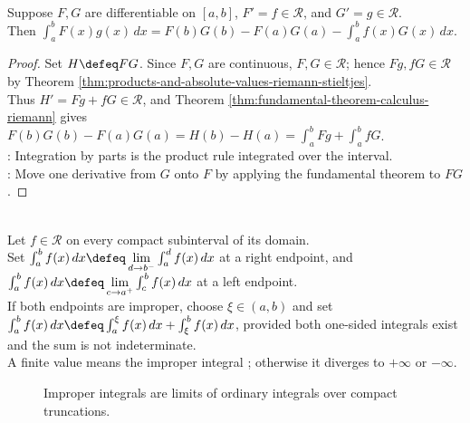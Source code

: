 \begin{theorem} \label{thm:riemann-integration-by-parts} \\
Suppose $F,G$ are differentiable on $[a,b]$, $F'=f\in\mathcal{R}$, and $G'=g\in\mathcal{R}$.\\
Then $\int_a^b F(x)g(x)\,dx=F(b)G(b)-F(a)G(a)-\int_a^b f(x)G(x)\,dx$.
\begin{proof}
Set $H\defeq FG$. Since $F,G$ are continuous, $F,G\in\mathcal{R}$; hence $Fg,fG\in\mathcal{R}$ by Theorem \ref{thm:products-and-absolute-values-riemann-stieltjes}.\\
Thus $H'=Fg+fG\in\mathcal{R}$, and Theorem \ref{thm:fundamental-theorem-calculus-riemann} gives $F(b)G(b)-F(a)G(a)=H(b)-H(a)=\int_a^b Fg+\int_a^b fG$.\\
: Integration by parts is the product rule integrated over the interval.\\
: Move one derivative from $G$ onto $F$ by applying the fundamental theorem to $FG$.
\end{proof}
\end{theorem}

\begin{definition} \label{def:improper-riemann-integral} \\
Let $f\in\mathcal{R}$ on every compact subinterval of its domain.\\
Set $\int_a^b f(x)\,dx\defeq\lim\limits_{d\to b^-}\int_a^d f(x)\,dx$ at a right endpoint, and $\int_a^b f(x)\,dx\defeq\lim\limits_{c\to a^+}\int_c^b f(x)\,dx$ at a left endpoint.\\
If both endpoints are improper, choose $\xi\in(a,b)$ and set $\int_a^b f(x)\,dx \defeq \int_a^\xi f(x)\,dx+\int_\xi^b f(x)\,dx$, provided both one-sided integrals exist and the sum is not indeterminate.\\
A finite value means the improper integral ; otherwise it diverges to $+\infty$ or $-\infty$.
\end{definition}

\begin{figure}[H]
  \centering
  
  \caption{Improper integrals are limits of ordinary integrals over compact truncations.}
  \label{fig:improper-integral-truncations}
\end{figure}


